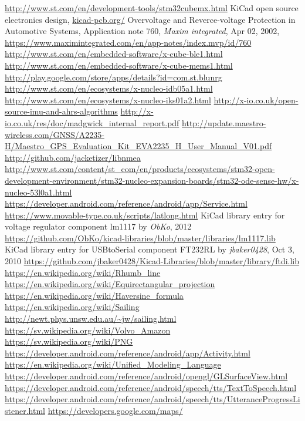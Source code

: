 \begin{thebibliography}{9}
\label{sec:ref}


  \url{http://www.st.com/en/development-tools/stm32cubemx.html}
  KiCad open source electronics design,
  \url{kicad-pcb.org/}
	Overvoltage and Reverce-voltage Protection in Automotive Systems,
	Application note 760, \emph{Maxim integrated}, Apr 02, 2002, 
	\url{https://www.maximintegrated.com/en/app-notes/index.mvp/id/760}
  \url{http://www.st.com/en/embedded-software/x-cube-ble1.html}
  \url{http://www.st.com/en/embedded-software/x-cube-mems1.html}
  \url{http://play.google.com/store/apps/details?id=com.st.blunrg}
  \url{http://www.st.com/en/ecosystems/x-nucleo-idb05a1.html}
  \url{http://www.st.com/en/ecosystems/x-nucleo-iks01a2.html}
  \url{http://x-io.co.uk/open-source-imu-and-ahrs-algorithms}
  \url{http://x-io.co.uk/res/doc/madgwick_internal_report.pdf}
  \url{http://update.maestro-wireless.com/GNSS/A2235-H/Maestro_GPS_Evaluation_Kit_EVA2235_H_User_Manual_V01.pdf}
  \url{http://github.com/jacketizer/libnmea}
  \url{http://www.st.com/content/st_com/en/products/ecosystems/stm32-open-development-environment/stm32-nucleo-expansion-boards/stm32-ode-sense-hw/x-nucleo-53l0a1.html}
  \url{https://developer.android.com/reference/android/app/Service.html}
  \url{https://www.movable-type.co.uk/scripts/latlong.html}
	KiCad library entry for voltage regulator component lm1117 by \emph{ObKo}, 2012  
  \url{https://github.com/ObKo/kicad-libraries/blob/master/libraries/lm1117.lib}
	KiCad library entry for USBtoSerial component FT232RL by \emph{jbaker0428}, Oct 3, 2010
	\url{https://github.com/jbaker0428/Kicad-Libraries/blob/master/library/ftdi.lib}
  \url{https://en.wikipedia.org/wiki/Rhumb_line}
  \url{https://en.wikipedia.org/wiki/Equirectangular_projection}
  \url{https://en.wikipedia.org/wiki/Haversine_formula}
  \url{https://en.wikipedia.org/wiki/Sailing}
  \url{http://newt.phys.unsw.edu.au/~jw/sailing.html}
  \url{https://sv.wikipedia.org/wiki/Volvo_Amazon}
  \url{https://sv.wikipedia.org/wiki/PNG}
  \url{https://developer.android.com/reference/android/app/Activity.html}
  \url{https://en.wikipedia.org/wiki/Unified_Modeling_Language}
  \url{https://developer.android.com/reference/android/opengl/GLSurfaceView.html}
  \url{https://developer.android.com/reference/android/speech/tts/TextToSpeech.html}
  \url{https://developer.android.com/reference/android/speech/tts/UtteranceProgressListener.html}
  \url{https://developers.google.com/maps/}


\end{thebibliography}

